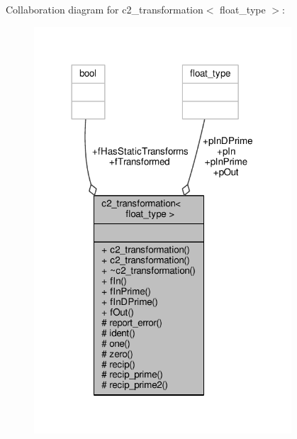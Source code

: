 Collaboration diagram for c2\+\_\+transformation$<$ float\+\_\+type $>$\+:
\nopagebreak
\begin{figure}[H]
\begin{center}
\leavevmode
\includegraphics[width=272pt]{classc2__transformation__coll__graph}
\end{center}
\end{figure}
